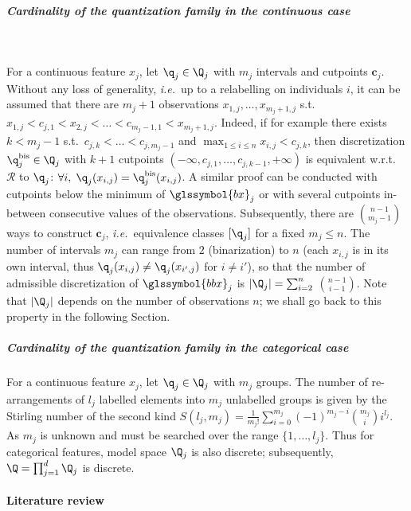 \subparagraph{Cardinality of the quantization family in the continuous case} ~\label{par:cardinality}

For a continuous feature $x_j$, let $\q_j \in \Q_j$ with $m_j$ intervals and cutpoints $\boldsymbol{c}_j$. Without any loss of generality, \textit{i.e.}\ up to a relabelling on individuals $i$, it can be assumed that there are $m_j+1$ observations $x_{1,j},\dots,x_{m_j+1,j}$ s.t.\ $x_{1,j} < c_{j,1} < x_{2,j} < \dots < c_{m_j-1,1} < x_{m_j+1,j}$. Indeed, if for example there exists $k < m_j - 1$ s.t.\ $c_{j,k} < \dots < c_{j,m_j-1}$ and $\max_{1 \leq i \leq n} x_{i,j} < c_{j,k}$, then discretization $\q^{\text{bis}}_j \in \Q_j$ with $k+1$ cutpoints $(-\infty,c_{j,1},\dots,c_{j,k-1},+\infty)$ is equivalent w.r.t.\ $\mathcal{R}$ to $\q_j$: $\forall i, \; \q_j(x_{i,j}) = \q^{\text{bis}}_j(x_{i,j})$. A similar proof can be conducted with cutpoints below the minimum of $\glssymbol{bx}_j$ or with several cutpoints in-between consecutive values of the observations. Subsequently, there are $\binom{n-1}{m_j-1}$ ways to construct $\bm{c}_j$, \textit{i.e.}\ equivalence classes $[\q_j]$ for a fixed $m_j \leq n$. The number of intervals $m_j$ can range from $2$ (binarization) to $n$ (each $x_{i,j}$ is in its own interval, thus $\q_j(x_{i,j}) \neq \q_j(x_{i',j})$ for $i \neq i'$), so that the number of admissible discretization of $\glssymbol{bbx}_j$ is $|\Q_j| = \sum_{i=2}^{n}$ ${n-1}\choose{i-1}$. Note that $|\Q_j|$ depends on the number of observations $n$; we shall go back to this property in the following Section.


\subparagraph{Cardinality of the quantization family in the categorical case}

For a continuous feature $x_j$, let $\q_j \in \Q_j$ with $m_j$ groups. The number of re-arrangements of $l_j$ labelled elements into $m_j$ unlabelled groups is given by the Stirling number of the second kind $S(l_j,m_j) = \frac{1}{m_j!} \sum_{i=0}^{m_j} (-1)^{m_j-i} {m_j \choose i} i^{l_j}$. As $m_j$ is unknown and must be searched over the range $\{1,\dots,l_j\}$. Thus for categorical features, model space $\Q_j$ is also discrete; subsequently, $\Q = \prod_{j=1}^d \Q_j$ is discrete.







\paragraph{Literature review}

